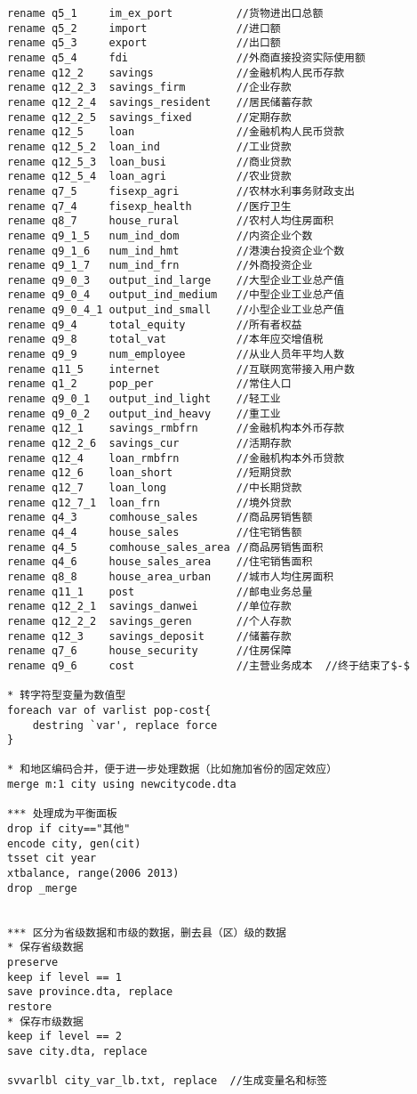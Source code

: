 \begin{framed}
\begin{verbatim}
rename q5_1		im_ex_port			//货物进出口总额
rename q5_2		import				//进口额
rename q5_3		export				//出口额
rename q5_4		fdi					//外商直接投资实际使用额
rename q12_2	savings				//金融机构人民币存款
rename q12_2_3	savings_firm		//企业存款
rename q12_2_4	savings_resident	//居民储蓄存款
rename q12_2_5	savings_fixed		//定期存款
rename q12_5	loan				//金融机构人民币贷款
rename q12_5_2	loan_ind			//工业贷款
rename q12_5_3	loan_busi			//商业贷款
rename q12_5_4	loan_agri			//农业贷款
rename q7_5		fisexp_agri			//农林水利事务财政支出
rename q7_4		fisexp_health		//医疗卫生
rename q8_7		house_rural			//农村人均住房面积
rename q9_1_5	num_ind_dom			//内资企业个数
rename q9_1_6	num_ind_hmt			//港澳台投资企业个数
rename q9_1_7	num_ind_frn			//外商投资企业
rename q9_0_3	output_ind_large	//大型企业工业总产值
rename q9_0_4	output_ind_medium	//中型企业工业总产值
rename q9_0_4_1 output_ind_small	//小型企业工业总产值
rename q9_4		total_equity		//所有者权益
rename q9_8		total_vat			//本年应交增值税
rename q9_9		num_employee		//从业人员年平均人数
rename q11_5	internet			//互联网宽带接入用户数
rename q1_2		pop_per				//常住人口
rename q9_0_1	output_ind_light	//轻工业
rename q9_0_2	output_ind_heavy	//重工业
rename q12_1	savings_rmbfrn		//金融机构本外币存款
rename q12_2_6	savings_cur			//活期存款
rename q12_4	loan_rmbfrn			//金融机构本外币贷款
rename q12_6	loan_short			//短期贷款
rename q12_7	loan_long			//中长期贷款
rename q12_7_1	loan_frn			//境外贷款
rename q4_3		comhouse_sales		//商品房销售额
rename q4_4		house_sales			//住宅销售额
rename q4_5		comhouse_sales_area	//商品房销售面积
rename q4_6		house_sales_area	//住宅销售面积
rename q8_8		house_area_urban	//城市人均住房面积
rename q11_1	post				//邮电业务总量
rename q12_2_1	savings_danwei		//单位存款
rename q12_2_2	savings_geren		//个人存款
rename q12_3	savings_deposit		//储蓄存款
rename q7_6		house_security		//住房保障
rename q9_6		cost				//主营业务成本  //终于结束了$-$

* 转字符型变量为数值型
foreach var of varlist pop-cost{
	destring `var', replace force
}

* 和地区编码合并，便于进一步处理数据（比如施加省份的固定效应）
merge m:1 city using newcitycode.dta

*** 处理成为平衡面板
drop if city=="其他"
encode city, gen(cit)
tsset cit year
xtbalance, range(2006 2013)
drop _merge


*** 区分为省级数据和市级的数据，删去县（区）级的数据
* 保存省级数据
preserve 
keep if level == 1
save province.dta, replace
restore
* 保存市级数据
keep if level == 2
save city.dta, replace

svvarlbl city_var_lb.txt, replace  //生成变量名和标签
\end{verbatim}
\end{framed}

